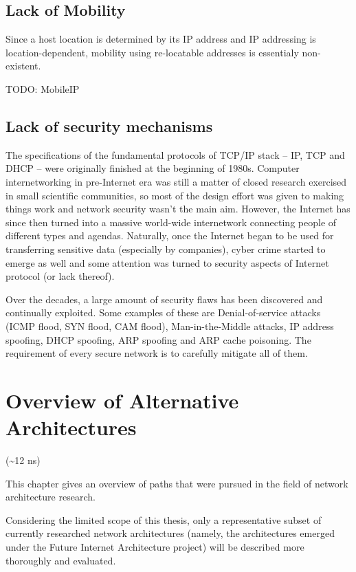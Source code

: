     \section{Lack of Mobility}

        Since a host location is determined by its IP address and IP addressing is location-dependent, mobility using re-locatable addresses is essentialy non-existent.

        TODO: MobileIP

    \section{Lack of security mechanisms}
        The specifications of the fundamental protocols of TCP/IP stack -- IP, TCP and DHCP -- were originally finished at the beginning of 1980s. Computer internetworking in pre-Internet era was still a matter of closed research exercised in small scientific communities, so most of the design effort was given to making things work and network security wasn't the main aim. However, the Internet has since then turned into a massive world-wide internetwork connecting people of different types and agendas. Naturally, once the Internet began to be used for transferring sensitive data (especially by companies), cyber crime started to emerge as well and some attention was turned to security aspects of Internet protocol (or lack thereof).

        Over the decades, a large amount of security flaws has been discovered and continually exploited. Some examples of these are Denial-of-service attacks (ICMP flood, SYN flood, CAM flood), Man-in-the-Middle attacks, IP address spoofing, DHCP spoofing, ARP spoofing and ARP cache poisoning. The requirement of every secure network is to carefully mitigate all of them.

\chapter{Overview of Alternative Architectures}
    (\textasciitilde12 ns)

    This chapter gives an overview of paths that were pursued in the field of network architecture research.

    Considering the limited scope of this thesis, only a representative subset of currently researched network architectures (namely, the architectures emerged under the Future Internet Architecture project) will be described more thoroughly and evaluated.

